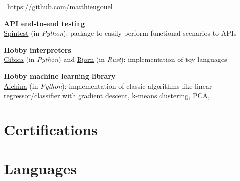 \documentclass[11pt,a4paper,sans]{moderncv} %
\begin{document}
\faGithub~\href{https://github.com/matthieugouel}{https://github.com/matthieugouel}
\vspace{+0.25cm}

\textbf{API end-to-end testing}\\
\href{https://github.com/societe-generale/spintest}{Spintest} (in \emph{Python}): package to easily perform functional scenarios to APIs
\vspace{+0.25cm}

\textbf{Hobby interpreters}\\
\href{https://github.com/matthieugouel/gibica}{Gibica} (in \emph{Python}) and \href{https://github.com/matthieugouel/bjorn}{Bjorn} (in \emph{Rust}): implementation of toy languages
\vspace{0.25cm}

\textbf{Hobby machine learning library}\\
\href{https://github.com/matthieugouel/alchina}{Alchina} (in \emph{Python}): implementation of classic algorithms like linear regressor/classifier with gradient descent, k-means clustering, PCA, ... 


\section{Certifications}



\section{Languages}

\end{document}
